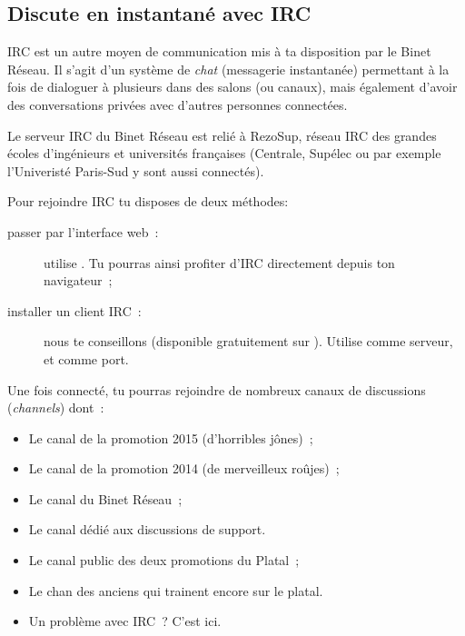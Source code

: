 %
\subsection{Discute en instantané avec IRC}

\label{irc}

IRC est un autre moyen de communication mis à ta disposition par le Binet Réseau.
Il s'agit d'un système de \emph{chat} (messagerie instantanée) permettant à la fois de dialoguer à plusieurs dans des salons (ou canaux),
mais également d'avoir des conversations privées avec d'autres personnes connectées.


Le serveur IRC du Binet Réseau est relié à RezoSup, réseau IRC des grandes écoles d'ingénieurs et universités françaises (Centrale, Supélec ou par exemple l'Univeristé Paris-Sud y sont aussi connectés).

Pour rejoindre IRC tu disposes de deux méthodes:

\begin{description}
  \item[passer par l'interface web~:] utilise . Tu pourras ainsi profiter d'IRC directement depuis ton navigateur~;
  \item[installer un client IRC~:] nous te conseillons  (disponible gratuitement sur \linebreak {}). Utilise   comme serveur, et  comme port.
\end{description}

Une fois connecté, tu pourras rejoindre de nombreux canaux de discussions (\emph{channels}) dont~:
\begin{itemize}
  \item {} Le canal de la promotion 2015 (d'horribles jônes)~;
   \item {} Le canal de la promotion 2014 (de merveilleux roûjes)~;
  \item {} Le canal du Binet Réseau~;
  \item {} Le canal dédié aux discussions de support.
  \item {} Le canal public des deux promotions du Platal~;
  \item {} Le chan des anciens qui trainent encore sur le platal.
  \item {} Un problème avec IRC~? C'est ici.
\end{itemize}

